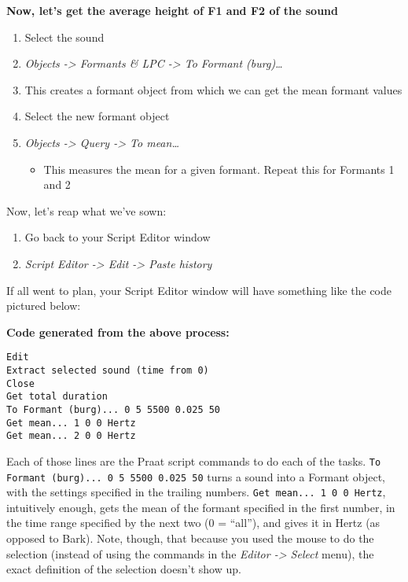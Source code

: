 \documentclass[11pt]{article}
\def\tightlist{}
\begin{document}
\textbf{Now, let's get the average height of F1 and F2 of the sound}

\begin{enumerate}
\def\labelenumi{\arabic{enumi}.}
\setcounter{enumi}{5}
\tightlist
\item
  Select the sound
\item
  \emph{Objects -\textgreater{} Formants \& LPC -\textgreater{} To
  Formant (burg)\ldots{}}
\item
  This creates a formant object from which we can get the mean formant
  values
\item
  Select the new formant object
\item
  \emph{Objects -\textgreater{} Query -\textgreater{} To mean\ldots{}}

  \begin{itemize}
  \tightlist
  \item
    This measures the mean for a given formant. Repeat this for Formants
    1 and 2
  \end{itemize}
\end{enumerate}

Now, let's reap what we've sown:

\begin{enumerate}
\def\labelenumi{\arabic{enumi}.}
\setcounter{enumi}{10}
\tightlist
\item
  Go back to your Script Editor window
\item
  \emph{Script Editor -\textgreater{} Edit -\textgreater{} Paste
  history}
\end{enumerate}

If all went to plan, your Script Editor window will have something like
the code pictured below:

\textbf{Code generated from the above process:}

\begin{verbatim} 
Edit
Extract selected sound (time from 0)
Close
Get total duration
To Formant (burg)... 0 5 5500 0.025 50
Get mean... 1 0 0 Hertz
Get mean... 2 0 0 Hertz
\end{verbatim}

Each of those lines are the Praat script commands to do each of the
tasks. \texttt{To Formant (burg)... 0 5 5500 0.025 50} turns a sound
into a Formant object, with the settings specified in the trailing
numbers. \texttt{Get mean... 1 0 0 Hertz}, intuitively enough, gets the
mean of the formant specified in the first number, in the time range
specified by the next two (0 = ``all''), and gives it in Hertz (as
opposed to Bark). Note, though, that because you used the mouse to do
the selection (instead of using the commands in the \emph{Editor
-\textgreater{} Select} menu), the exact definition of the selection
doesn't show up.
\end{document}
